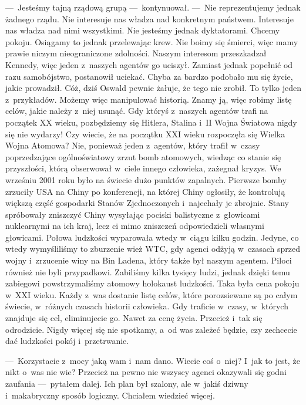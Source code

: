 ---~Jesteśmy tajną rządową grupą ---~kontynuował. ---~Nie reprezentujemy jednak żadnego rządu. Nie interesuje nas władza nad konkretnym państwem. Interesuje nas władza nad nimi wszystkimi. Nie jesteśmy jednak dyktatorami. Chcemy pokoju. Osiągamy to jednak przelewając krew. Nie boimy się śmierci, więc mamy prawie niczym nieograniczone zdolności. Naszym interesom przeszkadzał Kennedy, więc jeden z~naszych agentów go uciszył. Zamiast jednak popełnić od razu samobójstwo, postanowił uciekać. Chyba za bardzo podobało mu się życie, jakie prowadził. Cóż, dziś Oswald pewnie żałuje, że tego nie zrobił. To tylko jeden z~przykładów. Możemy więc manipulować historią. Znamy ją, więc robimy listę celów, jakie należy z~niej usunąć. Gdy któryś z~naszych agentów trafi na początek XX wieku, pozbędziemy się Hitlera, Stalina i~II Wojna Światowa nigdy się nie wydarzy! Czy wiecie, że na początku XXI wieku rozpoczęła się Wielka Wojna Atomowa? Nie, ponieważ jeden z~agentów, który trafił w~czasy poprzedzające ogólnoświatowy zrzut bomb atomowych, wiedząc co stanie się przyszłości, którą obserwował w~ciele innego człowieka, zażegnał kryzys. We wrześniu 2001 roku było na świecie dużo punktów zapalnych. Pierwsze bomby zrzuciły USA na Chiny po konferencji, na której Chiny ogłosiły, że kontrolują większą część gospodarki Stanów Zjednoczonych i~najechały je zbrojnie. Stany spróbowały zniszczyć Chiny wysyłając pociski balistyczne z~głowicami nuklearnymi na ich kraj, lecz ci mimo zniszczeń odpowiedzieli własnymi głowicami. Połowa ludzkości wyparowała wtedy w~ciągu kilku godzin. Jedyne, co wtedy wymyśliliśmy to zburzenie wież WTC, gdy agenci odżyją w~czasach sprzed wojny i~zrzucenie winy na Bin Ladena, który także był naszym agentem. Piloci również nie byli przypadkowi. Zabiliśmy kilka tysięcy ludzi, jednak dzięki temu zabiegowi powstrzymaliśmy atomowy holokaust ludzkości. Taka była cena pokoju w~XXI wieku. Każdy z~was dostanie listę celów, które porozsiewane są po całym świecie, w~różnych czasach historii człowieka. Gdy traficie w~czasy, w~których znajduje się cel, eliminujecie go. Nawet za cenę życia. Przecież i~tak się odrodzicie. Nigdy więcej się nie spotkamy, a~od was zależeć będzie, czy zechcecie dać ludzkości pokój i~przetrwanie.

---~Korzystacie z~mocy jaką wam i~nam dano. Wiecie coś o~niej? I~jak to jest, że nikt o~was nie wie? Przecież na pewno nie wszyscy agenci okazywali się godni zaufania ---~pytałem dalej. Ich plan był szalony, ale w~jakiś dziwny i~makabryczny sposób logiczny. Chciałem wiedzieć więcej.

